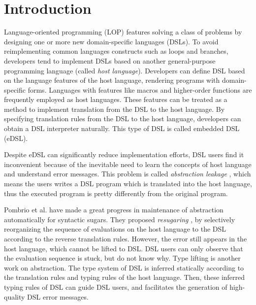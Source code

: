 \section{Introduction}

Language-oriented programming (LOP) \cite{LOP} features solving a class of problems by designing one or more new domain-specific languages (DSLs).
To avoid reimplementing common languages constructs such as loops and branches,
developers tend to implement DSLs based on another general-purpose programming language (called \textit{host language}).
Developers can define DSL based on the language features of the host language, rendering programs with domain-specific forms.
Languages with features like macros and higher-order functions are frequently employed as host languages\cite{macro-dsl,macro-dsl-2}.
These features can be treated as a method to implement translation from the DSL to the host language.
By specifying translation rules from the DSL to the host language, developers can obtain a DSL interpreter naturally.
This type of DSL is called embedded DSL (eDSL).

Despite eDSL can significantly reduce implementation efforts, DSL users find it inconvenient because of the inevitable need to learn the concepts of host language and understand error messages.
This problem is called \textit{abstraction leakage} \cite{Abstraction},
 which means the users writes a DSL program which is translated into the host language,
 thus the executed program is pretty differently from the original program.

Pombrio et al. have made a great progress in maintenance of abstraction automatically for syntactic sugars.
They proposed \textit{resugaring} \cite{resugar}, by selectively reorganizing the sequence of evaluations on the host language to the DSL according to the reverse translation rules.
However, the error still appears in the host language, which cannot be lifted to DSL.
DSL users can only observe that the evaluation sequence is stuck, but do not know why. 
Type lifting \cite{infer-types} is another work on abstraction.
The type system of DSL is inferred statically according to the translation rules and typing rules of the host language.
Then, these inferred typing rules of DSL can guide DSL users,
 and facilitates the generation of high-quality DSL error messages.

